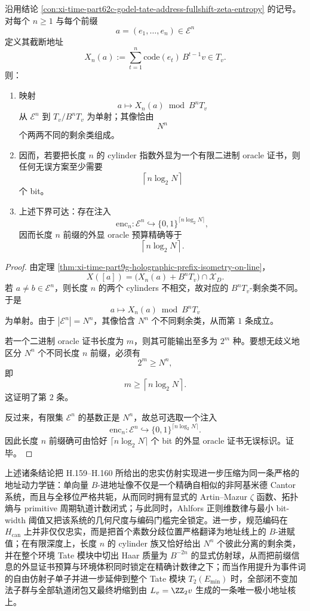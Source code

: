 \begin{conclusion}\label{con:xi-time-part62c-godel-tate-prefix-oracle-budget}
沿用结论 \ref{con:xi-time-part62c-godel-tate-address-fullshift-zeta-entropy} 的记号。对每个 \(n\ge 1\) 与每个前缀
\[
a=(e_1,\dots,e_n)\in\mathcal E^n
\]
定义其截断地址
\[
X_n(a):=\sum_{t=1}^{n}\mathrm{code}(e_t)\,B^{t-1}v\in T_v.
\]
则：
\begin{enumerate}
  \item 映射
  \[
  a\longmapsto X_n(a)\bmod B^nT_v
  \]
  从 \(\mathcal E^n\) 到 \(T_v/B^nT_v\) 为单射；其像恰由
  \[
  N^n
  \]
  个两两不同的剩余类组成。
  \item 因而，若要把长度 \(n\) 的 cylinder 指数外显为一个有限二进制 oracle 证书，则任何无误方案至少需要
  \[
  \left\lceil n\log_2N\right\rceil
  \]
  个 bit。
  \item 上述下界可达：存在注入
  \[
  \mathrm{enc}_n:\mathcal E^n\hookrightarrow \{0,1\}^{\lceil n\log_2N\rceil},
  \]
  因而长度 \(n\) 前缀的外显 oracle 预算精确等于
  \[
  \left\lceil n\log_2N\right\rceil .
  \]
\end{enumerate}
\end{conclusion}
\begin{proof}
由定理 \ref{thm:xi-time-part9g-holographic-prefix-isometry-on-line}，
\[
X([a])=\bigl(X_n(a)+B^nT_v\bigr)\cap \mathcal X_D.
\]
若 \(a\neq b\in\mathcal E^n\)，则长度 \(n\) 的两个 cylinders 不相交，故对应的 \(B^nT_v\)-剩余类不同。于是
\[
a\longmapsto X_n(a)\bmod B^nT_v
\]
为单射。由于 \(|\mathcal E^n|=N^n\)，其像恰含 \(N^n\) 个不同剩余类，从而第 \(1\) 条成立。

若一个二进制 oracle 证书长度为 \(m\)，则其可能输出至多为 \(2^m\) 种。要想无歧义地区分 \(N^n\) 个不同长度 \(n\) 前缀，必须有
\[
2^m\ge N^n,
\]
即
\[
m\ge \left\lceil n\log_2N\right\rceil.
\]
这证明了第 \(2\) 条。

反过来，有限集 \(\mathcal E^n\) 的基数正是 \(N^n\)，故总可选取一个注入
\[
\mathrm{enc}_n:\mathcal E^n\hookrightarrow \{0,1\}^{\lceil n\log_2N\rceil}.
\]
因此长度 \(n\) 前缀确可由恰好 \(\lceil n\log_2N\rceil\) 个 bit 的外显 oracle 证书无误标识。证毕。
\end{proof}




\noindent
上述诸条结论把 H.159--H.160 所给出的忠实仿射实现进一步压缩为同一条严格的地址动力学链：单向量 \(B\)-进地址像不仅是一个精确自相似的非阿基米德 Cantor 系统，而且与全移位严格共轭，从而同时拥有显式的 Artin--Mazur \(\zeta\) 函数、拓扑熵与 primitive 周期轨道计数闭式；与此同时，Ahlfors 正则维数律与最小 bit-width 阈值又把该系统的几何尺度与编码门槛完全锁定。进一步，规范编码在 \(H_{\mathrm{can}}\) 上并非仅仅忠实，而是把首个素数分歧位置严格翻译为地址线上的 \(B\)-进赋值；在有限深度上，长度 \(n\) 的 cylinder 族又恰好给出 \(N^n\) 个彼此分离的剩余类，并在整个环境 Tate 模块中切出 Haar 质量为 \(B^{-2n}\) 的显式仿射球，从而把前缀信息的外显证书预算与环境体积同时锁定在精确计数律之下；而当作用提升为事件词的自由仿射子单子并进一步延伸到整个 Tate 模块 \(T_2(E_{\min})\) 时，全部闭不变加法子群与全部轨道闭包又最终坍缩到由 \(L_v=\ZZ_2v\) 生成的一条唯一极小地址核上。

\endinput
